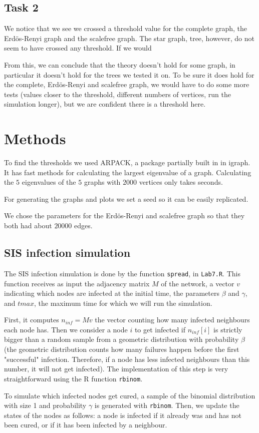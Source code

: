 \documentclass[paper=a4, fontsize=11pt]{scrartcl} %
\begin{document}
\subsection{Task 2}
We notice that we see we crossed a threshold value for the complete graph, the Erdös-Renyi graph and the scalefree graph. The star graph, tree, however, do not seem to have crossed any threshold. If we would 

From this, we can conclude that the theory doesn't hold for some graph, in particular it doesn't hold for the trees we tested it on. To be sure it does hold for the complete, Erdös-Renyi and scalefree graph, we would have to do some more tests (values closer to the threshold, different numbers of vertices, run the simulation longer), but we are confident there is a threshold here.

\section{Methods}
To find the thresholds we used ARPACK, a package partially built in in igraph. It has fast methods for calculating the largest eigenvalue of a graph. Calculating the $5$ eigenvalues of the $5$ graphs with $2000$ vertices only takes seconds.

For generating the graphs and plots we set a seed so it can be easily replicated.

We chose the parameters for the Erdös-Renyi and scalefree graph so that they both had about $20000$ edges.

\subsection{SIS infection simulation}
The SIS infection simulation is done by the function \texttt{spread}, in \texttt{Lab7.R}. This function receives as input the adjacency matrix $M$ of the network, a vector $v$ indicating which nodes are infected at the initial time, the parameters $\beta$ and $\gamma$, and $tmax$, the maximum time for which we will run the simulation. 

First, it computes $n_{inf}=M v$ the vector counting how many infected neighbours each node has. Then we consider a node $i$ to get infected if $n_{inf}[i]$ is strictly bigger than a random sample from a geometric distribution with probability $\beta$ (the geometric distribution counts how many failures happen before the first "successful" infection. Therefore, if a node has less infected neighbours than this number, it will not get infected). The implementation of this step is very straightforward using the R function \texttt{rbinom}.

To simulate which infected nodes get cured, a sample of the binomial distribution with size 1 and probability $\gamma$ is generated with \texttt{rbinom}. Then, we update the states of the nodes as follows: a node is infected if it already was and has not been cured, or if it has been infected by a neighbour.
\end{document}

